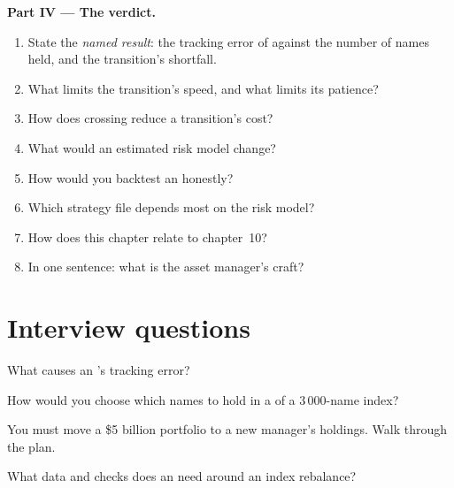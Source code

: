 \begin{problem}
\medskip\noindent\textbf{Part IV --- The verdict.}
\begin{enumerate}[resume]
\item State the \emph{named result}: the tracking error of  against the number of names held, and the transition's shortfall.
\item What limits the transition's speed, and what limits its patience?
\item How does crossing reduce a transition's cost?
\item What would an estimated risk model change?
\item How would you backtest an  honestly?
\item Which strategy file depends most on the risk model?
\item How does this chapter relate to chapter~10?
\item In one sentence: what is the asset manager's craft?
\end{enumerate}
\end{problem}

\section{Interview questions}

\begin{interviewq}\label{iq:s1:the-asset-managers-strategies:1}
What causes an 's tracking error?
\end{interviewq}

\begin{interviewq}\label{iq:s1:the-asset-managers-strategies:2}
How would you choose which names to hold in a  of a 3\,000-name index?
\end{interviewq}

\begin{interviewq}\label{iq:s1:the-asset-managers-strategies:3}
You must move a \$5 billion portfolio to a new manager's holdings. Walk through the plan.
\end{interviewq}

\begin{interviewq}\label{iq:s1:the-asset-managers-strategies:4}
What data and checks does an  need around an index rebalance?
\end{interviewq}

